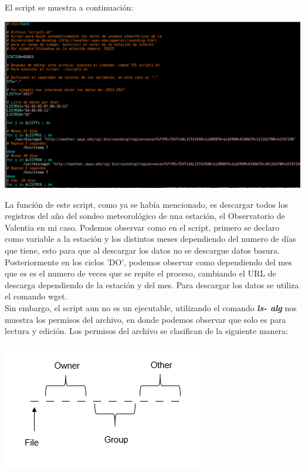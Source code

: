 \documentclass[12pt]{article}
\begin{document}
El script se muestra a continuación:

\begin{center}
\includegraphics[scale=0.5]{Script.png}
\end{center} 

La función de este script, como ya se había mencionado, es descargar todos los registros del año del sondeo meteorológico de una estación, el Observatorio de Valentia en mi caso. Podemos observar como en el script, primero se declaro como variable a la estación y los distintos meses dependiendo del numero de días que tiene, esto para que al descargar los datos no se descargue datos basura. Posteriormente en los ciclos 'DO', podemos observar como dependiendo del mes que es es el numero de veces que se repite el proceso, cambiando el URL de descarga dependiendo de la estación y del mes. Para descargar los datos se utiliza el comando wget. \\ 

Sin embargo, el script aun no es un ejecutable, utilizando el comando \textit{\textbf{ls- alg}} nos muestra los permisos del archivo, en donde podemos observar que solo es para lectura y edición. Los permisos del archivo se clasifican de la siguiente manera:

\begin{center}
\includegraphics[scale=0.7]{Tipo_de_archivo.png}
\end{center} 
\end{document}
